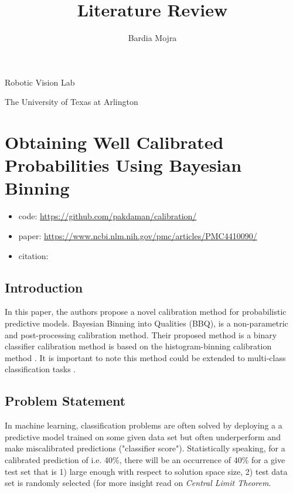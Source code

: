 \documentclass[11pt]{article}
\title{Literature Review}
\author{Bardia Mojra}
\begin{document}
\maketitle
\thispagestyle{empty}

\bigskip
\bigskip
\begin{center}
      Robotic Vision Lab
\end{center}

\begin{center}
      The University of Texas at Arlington
\end{center}

\section{Obtaining Well Calibrated Probabilities Using Bayesian Binning}

\begin{itemize}
      \item code: \url{https://github.com/pakdaman/calibration/}
      \item paper: \url{https://www.ncbi.nlm.nih.gov/pmc/articles/PMC4410090/}
      \item citation: \cite{naeini2015obtaining}
\end{itemize}

      \subsection{Introduction}
      \par In this paper, the authors propose a novel calibration method for
      probabilistic predictive models. Bayesian Binning into Qualities (BBQ),
      is a non-parametric and post-processing calibration method. Their
      proposed method is a binary classifier calibration method is based on the
      histogram-binning calibration method \cite{zadrozny2001obtaining}. It is
      important to note this method could be extended to multi-class
      classification tasks \cite{zadrozny2002transforming}.

      \subsection{Problem Statement}
      \par In machine learning, classification problems are often solved by deploying a
      a predictive model trained on some given data set but often underperform and
      make miscalibrated predictions ("classifier score"). Statistically speaking, for
      a calibrated prediction of i.e. 40\%, there will be an occurrence of 40\% for a
      give test set that is 1) large enough with respect to solution space size, 2)
      test data set is randomly selected (for more insight read on
      \textit{Central Limit Theorem}.
\end{document}
